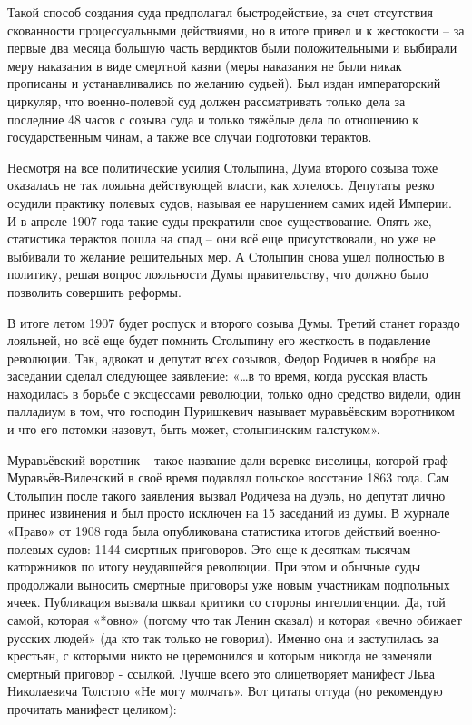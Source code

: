 Такой способ создания суда предполагал быстродействие, за счет отсутствия скованности процессуальными действиями, но в итоге привел и к жестокости – за первые два месяца большую часть вердиктов были положительными и выбирали меру наказания в виде смертной казни (меры наказания не были никак прописаны и устанавливались по желанию судьей). Был издан императорский циркуляр, что военно-полевой суд должен рассматривать только дела за последние 48 часов с созыва суда и только тяжёлые дела по отношению к государственным чинам, а также все случаи подготовки терактов.

Несмотря на все политические усилия Столыпина, Дума второго созыва тоже оказалась не так лояльна действующей власти, как хотелось. Депутаты резко осудили практику полевых судов, называя ее нарушением самих идей Империи. И в апреле 1907 года такие суды прекратили свое существование. Опять же, статистика терактов пошла на спад – они всё еще присутствовали, но уже не выбивали то желание решительных мер. А Столыпин снова ушел полностью в политику, решая вопрос лояльности Думы правительству, что должно было позволить совершить реформы.

В итоге летом 1907 будет роспуск и второго созыва Думы. Третий станет гораздо лояльней, но всё еще будет помнить Столыпину его жесткость в подавление революции. Так, адвокат и депутат всех созывов, Федор Родичев в ноябре на заседании сделал следующее заявление: «…в то время, когда русская власть находилась в борьбе с эксцессами революции, только одно средство видели, один палладиум в том, что господин Пуришкевич называет муравьёвским воротником и что его потомки назовут, быть может, столыпинским галстуком».

Муравьёвский воротник – такое название дали веревке виселицы, которой граф Муравьёв-Виленский в своё время подавлял польское восстание 1863 года. Сам Столыпин после такого заявления вызвал Родичева на дуэль, но депутат лично принес извинения и был просто исключен на 15 заседаний из думы.
В журнале «Право» от 1908 года была опубликована статистика итогов действий военно-полевых судов: 1144 смертных приговоров. Это еще к десяткам тысячам каторжников по итогу неудавшейся революции. При этом и обычные суды продолжали выносить смертные приговоры уже новым участникам подпольных ячеек. Публикация вызвала шквал критики со стороны интеллигенции. Да, той самой, которая «*овно» (потому что так Ленин сказал) и которая «вечно обижает русских людей» (да кто так только не говорил). Именно она и заступилась за крестьян, с которыми никто не церемонился и которым никогда не заменяли смертный приговор - ссылкой.
Лучше всего это олицетворяет манифест Льва Николаевича Толстого «Не могу молчать». Вот цитаты оттуда (но рекомендую прочитать манифест целиком):

